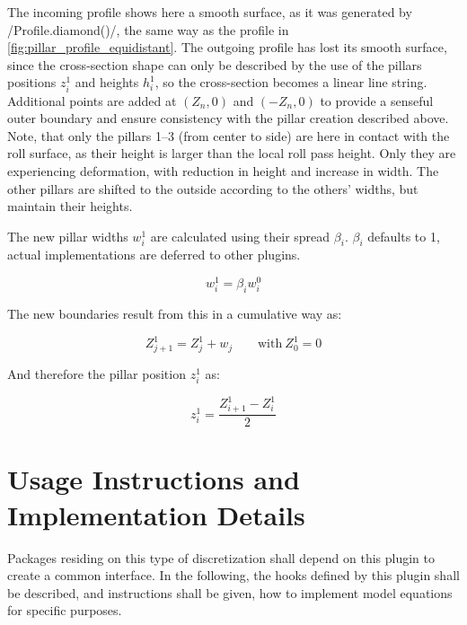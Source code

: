 \documentclass[11pt]{PyRollDocs}
\begin{document}
    The incoming profile shows here a smooth surface, as it was generated by \py/Profile.diamond()/, the same way as the profile in \autoref{fig:pillar_profile_equidistant}.
    The outgoing profile has lost its smooth surface, since the cross-section shape can only be described by the use of the pillars positions $z_i^1$ and heights $h_i^1$, so the cross-section becomes a linear line string.
    Additional points are added at $(Z_n, 0)$ and $(-Z_n, 0)$ to provide a senseful outer boundary and ensure consistency with the pillar creation described above.
    Note, that only the pillars 1--3 (from center to side) are here in contact with the roll surface, as their height is larger than the local roll pass height.
    Only they are experiencing deformation, with reduction in height and increase in width.
    The other pillars are shifted to the outside according to the others' widths, but maintain their heights.

    The new pillar widths $w_i^1$ are calculated using their spread $\beta_i$. $\beta_i$ defaults to \num{1}, actual implementations are deferred to other plugins.

    \begin{equation}
        w_i^1 = \beta_i w_i^0
        \label{eq:spread}
    \end{equation}

    The new boundaries result from this in a cumulative way as:

    \begin{equation}
        Z_{j+1}^1 = Z_j^1 + w_j \qquad \text{with}\ Z_0^1 = 0
        \label{eq:boundaries1}
    \end{equation}

    And therefore the pillar position $z_i^1$ as:

    \begin{equation}
        z_i^1 = \frac{Z^1_{i+1} - Z^1_i}{2}
        \label{eq:pillars1}
    \end{equation}


    \section{Usage Instructions and Implementation Details}\label{sec:usage-instructions}

    Packages residing on this type of discretization shall depend on this plugin to create a common interface.
    In the following, the hooks defined by this plugin shall be described, and instructions shall be given, how to implement model equations for specific purposes.
\end{document}
